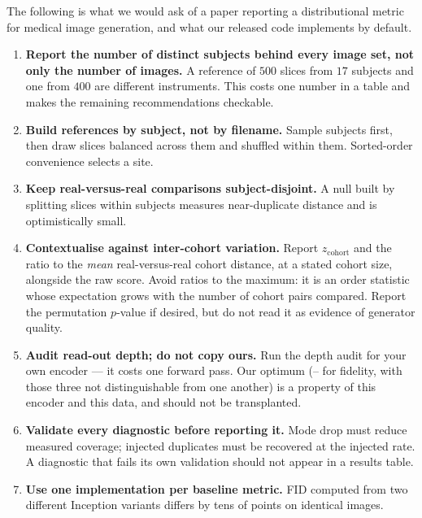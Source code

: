 The following is what we would ask of a paper reporting a distributional metric
for medical image generation, and what our released code implements by default.

\begin{enumerate}[leftmargin=*, topsep=2pt, itemsep=3pt]
\item \textbf{Report the number of distinct subjects behind every image set,
      not only the number of images.} A reference of $500$ slices from $17$
      subjects and one from $400$ are different instruments. This costs one
      number in a table and makes the remaining recommendations checkable.
\item \textbf{Build references by subject, not by filename.} Sample subjects
      first, then draw slices balanced across them and shuffled within them.
      Sorted-order convenience selects a site.
\item \textbf{Keep real-versus-real comparisons subject-disjoint.} A null built
      by splitting slices within subjects measures near-duplicate distance and
      is optimistically small.
\item \textbf{Contextualise against inter-cohort variation.} Report
      $z_{\mathrm{cohort}}$ and the ratio to the \emph{mean} real-versus-real
      cohort distance, at a stated cohort size, alongside the raw score. Avoid
      ratios to the maximum: it is an order statistic whose expectation grows
      with the number of cohort pairs compared. Report the permutation
      $p$-value if desired, but do not read it as evidence of generator
      quality.
\item \textbf{Audit read-out depth; do not copy ours.} Run the depth audit
      for your own encoder --- it costs one forward pass. Our optimum
      (-- for fidelity, with those three not distinguishable from
      one another) is a property of this encoder and this data, and should not
      be transplanted.
\item \textbf{Validate every diagnostic before reporting it.} Mode drop must
      reduce measured coverage; injected duplicates must be recovered at the
      injected rate. A diagnostic that fails its own validation should not
      appear in a results table.
\item \textbf{Use one implementation per baseline metric.} FID computed from
      two different Inception variants differs by tens of points on identical
      images.
\end{enumerate}

